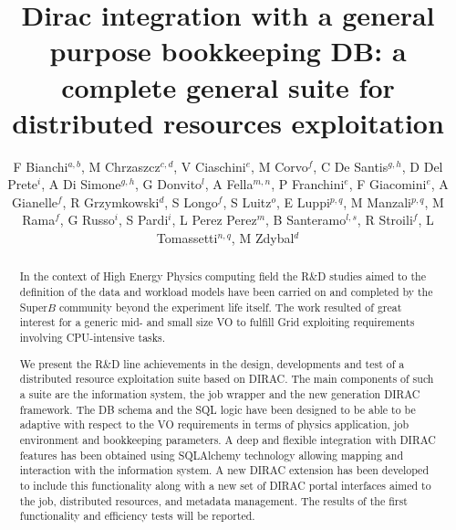 \documentclass[a4paper]{jpconf}
\begin{document}
\title{Dirac integration with a general purpose bookkeeping DB: a complete general suite for distributed resources exploitation}

\author{F Bianchi$^{a,b}$, M Chrzaszcz$^{c,d}$, V Ciaschini$^e$, M Corvo$^f$, C De Santis$^{g,h}$, D Del Prete$^i$, A Di Simone$^{g,h}$, G Donvito$^l$, A Fella$^{m,n}$, P Franchini$^e$, F Giacomini$^e$, A Gianelle$^f$, R Grzymkowski$^d$, S Longo$^f$, S Luitz$^o$, E Luppi$^{p,q}$, M Manzali$^{p,q}$, M Rama$^f$, G Russo$^i$, S Pardi$^i$, L Perez Perez$^m$, B Santeramo$^{l,s}$, R Stroili$^f$, L Tomassetti$^{n,q}$, M Zdybal$^d$}
\address{$^a$ University of Torino, Turin, Italy}
\address{$^b$ INFN - Sezione di Torino, Turin, Italy}
\address{$^c$ Physik-Institut, Universitat Zurich, Zurich, Switzerland}
\address{$^d$ Henryk Niewodniczanski Institute of Nuclear Physics Polish Academy of Sciences, Krakow, Poland}
\address{$^e$ INFN - CNAF, Bologna, Italy}
\address{$^f$ INFN - Sezione di Padova, Padua, Italy}
\address{$^g$ INFN - Sezione di Roma Tor Vergata, Rome, Italy}
\address{$^h$ Department of Physics, University of Rome Tor Vergata, Rome, Italy}
\address{$^i$ INFN – Sezione di Napoli, Naples, Italy}
\address{$^l$ INFN - Sezione di Bari, Bari, Italy}
\address{$^m$ INFN - Sezione di Pisa, Pisa, Italy}
\address{$^n$ Department of Mathematics and Computer Science, University of Ferrara, Ferrara, Italy}
\address{$^o$ SLAC, USA}
\address{$^p$ Department of Physics, University of Ferrara, Ferrara, Italy}
\address{$^q$ INFN - Sezione di Ferrara, Ferrara, Italy}
\address{$^r$ INFN LNF – Frascati, Italy}
\address{$^s$ Department of Physics, University and Polytechnic of Bari, Bari, Italy}

\begin{abstract}
In the context of High Energy Physics computing field the R\&D studies aimed to
the definition of the data and workload models have been carried on and 
completed by the Super$B$ community beyond the experiment life itself.
The work resulted of great interest for a generic mid- and small size VO to 
fulfill Grid exploiting requirements involving CPU-intensive tasks.

We present the R\&D line achievements in the design, developments and test of a
distributed resource exploitation suite based on DIRAC. The main components of
such a suite are the information system, the job wrapper and the new generation
DIRAC framework. The DB schema and the SQL logic have been designed to be able
to be adaptive with respect to the VO requirements in terms of physics 
application, job environment and bookkeeping parameters. A deep and flexible 
integration with DIRAC features has been obtained using SQLAlchemy technology
allowing mapping and interaction with the information system. A new DIRAC
extension has been developed to include this functionality along with a new set
of DIRAC portal interfaces aimed to the job, distributed resources, and
metadata management. The results of the first functionality and efficiency
tests will be reported.
\end{abstract}
\end{document}
